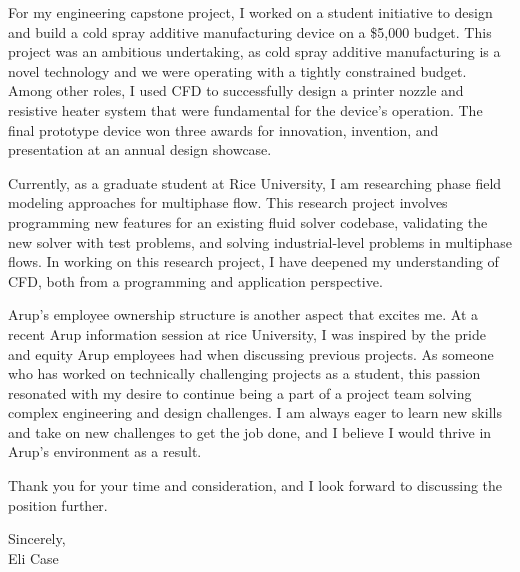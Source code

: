 \documentclass[letterpaper,11pt]{letter}
\newcommand{\paragraphbreak}{\vspace{5pt}}
\begin{document}
\paragraphbreak

For my engineering capstone project, I worked on a student initiative to design and build a cold spray additive manufacturing device on a \$5,000 budget. This project was an ambitious undertaking, as cold spray additive manufacturing is a novel technology and we were operating with a tightly constrained budget. Among other roles, I used CFD to successfully design a printer nozzle and resistive heater system that were fundamental for the device's operation. The final prototype device won three awards for innovation, invention, and presentation at an annual design showcase.

\paragraphbreak

Currently, as a graduate student at Rice University, I am researching phase field modeling approaches for multiphase flow. This research project involves programming new features for an existing fluid solver codebase, validating the new solver with test problems, and solving industrial-level problems in multiphase flows. In working on this research project, I have deepened my understanding of CFD, both from a programming and application perspective.

\paragraphbreak

Arup's employee ownership structure is another aspect that excites me. At a recent Arup information session at rice University, I was inspired by the pride and equity Arup employees had when discussing previous projects. As someone who has worked on technically challenging projects as a student, this passion resonated with my desire to continue being a part of a project team solving complex engineering and design challenges. I am always eager to learn new skills and take on new challenges to get the job done, and I believe I would thrive in Arup's environment as a result.

\paragraphbreak

Thank you for your time and consideration, and I look forward to discussing the position further.

\paragraphbreak

Sincerely, \\
Eli Case
\end{document}
